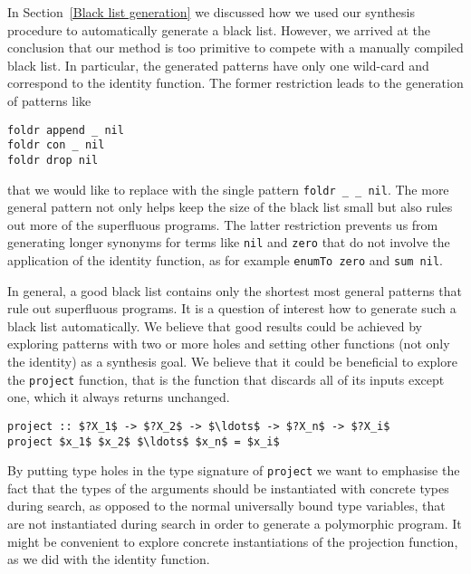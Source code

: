 In Section~\ref{Black list generation} we discussed how we used our synthesis procedure to automatically generate a black list. However, we arrived at the conclusion that our method is too primitive to compete with a manually compiled black list. In particular, the generated patterns have only one wild-card and correspond to the identity function. The former restriction leads to the generation of patterns like
\begin{lstlisting}[style=plain]
foldr append _ nil
foldr con _ nil
foldr drop nil
\end{lstlisting}
that we would like to replace with the single pattern \lstinline!foldr _ _ nil!. The more general pattern not only helps keep the size of the black list small but also rules out more of the superfluous programs.
The latter restriction prevents us from generating longer synonyms for terms like \lstinline!nil! and \lstinline!zero! that do not involve the application of the identity function, as for example \lstinline!enumTo zero! and \lstinline!sum nil!.

In general, a good black list contains only the shortest most general patterns that rule out superfluous programs. It is a question of interest how to generate such a black list automatically. We believe that good results could be achieved by exploring patterns with two or more holes and setting other functions (not only the identity) as a synthesis goal. We believe that it could be beneficial to explore the \lstinline!project! function, that is the function that discards all of its inputs except one, which it always returns unchanged.
\begin{lstlisting}[style=plain]
project :: $?X_1$ -> $?X_2$ -> $\ldots$ -> $?X_n$ -> $?X_i$
project $x_1$ $x_2$ $\ldots$ $x_n$ = $x_i$
\end{lstlisting}
By putting type holes in the type signature of \lstinline!project! we want to emphasise the fact that the types of the arguments should be instantiated with concrete types during search, as opposed to the normal universally bound type variables, that are not instantiated during search in order to generate a polymorphic program. It might be convenient to explore concrete instantiations of the projection function, as we did with the identity function.

